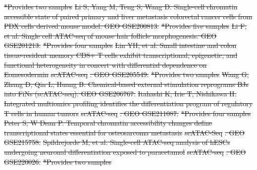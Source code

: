 \documentclass[referee, pdflatex, sn-vancouver-num]{sn-jnl}
\providecommand{\DIFdeltex}[1]{{\protect\color{red}\sout{#1}}}                      %
\providecommand{\DIFdel}[1]{\texorpdfstring{\DIFdeltex{#1}}{}} %
\begin{document}
\begin{appendices}
\DIFdel{*Provides two samples
	}%
\DIFdel{Li S, Yang M, Teng S, Wang D. Single-cell chromatin accessible state of paired primary and liver metastasis colorectal cancer cells from PDX cells derived mouse model. GEO GSE200813. }%
\DIFdel{*Provides five samples
	}%
\DIFdel{Li F, et al. Single cell ATAC-seq of mouse hair follicle morphogenesis. GEO GSE201213. }%
\DIFdel{*Provides four samples
	}%
\DIFdel{Lin YH, et al. Small intestine and colon tissue-resident memory CD8+ T cells exhibit transcriptional, epigenetic, and functional heterogeneity in concert with differential dependence on Eomesodermin }%
\DIFdel{scATAC-seq}%
\DIFdel{. GEO GSE205549. }%
\DIFdel{*Provides two samples
	}%
\DIFdel{Wang G, Zhang D, Qin L, Huang B. Chemical-based external stimulation reprograms BJs into FiNs (scATAC-seq). GEO GSE206767. }%
\DIFdel{Itahashi K, Irie T, Nishikawa H. Integrated multiomics profiling identifies the differentiation program of regulatory T cells in human tumors }%
\DIFdel{scATAC-seq}%
\DIFdel{. GEO GSE211087. }%
\DIFdel{*Provides four samples
	}%
\DIFdel{Peter S, W Dean P. Temporal chromatin accessibility changes define transcriptional states essential for osteosarcoma metastasis }%
\DIFdel{scATAC-Seq}%
\DIFdel{. GEO GSE215758. }%
\DIFdel{Spildrejorde M, et al. Single-cell ATAC-seq analysis of hESCs undergoing neuronal differentiation exposed to paracetamol }%
\DIFdel{scATAC-seq}%
\DIFdel{. GEO GSE220026. }%
\DIFdel{*Provides two samples
	}%

\end{appendices}
\end{document}
